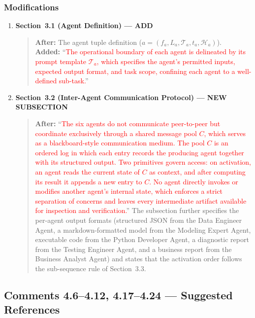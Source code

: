 \documentclass[11pt,a4paper]{article}
\begin{document}
\subsubsection{Modifications}
\begin{enumerate}
\item \textbf{Section~3.1 (Agent Definition) --- ADD}
\begin{quote}
\textbf{After:} The agent tuple definition ($a=(f_a, L_a, \mathcal{T}_a, t_a, \mathcal{H}_a)$).\\[4pt]
\textbf{Added:} ``\textcolor{red}{The operational boundary of each agent is delineated by its prompt template $\mathcal{T}_a$, which specifies the agent's permitted inputs, expected output format, and task scope, confining each agent to a well-defined sub-task.}''
\end{quote}
\item \textbf{Section~3.2 (Inter-Agent Communication Protocol) --- NEW SUBSECTION}
\begin{quote}
\textbf{After:} ``\textcolor{red}{The six agents do not communicate peer-to-peer but coordinate exclusively through a shared message pool $C$, which serves as a blackboard-style communication medium. The pool $C$ is an ordered log in which each entry records the producing agent together with its structured output. Two primitives govern access: on activation, an agent reads the current state of $C$ as context, and after computing its result it appends a new entry to $C$. No agent directly invokes or modifies another agent's internal state, which enforces a strict separation of concerns and leaves every intermediate artifact available for inspection and verification.}'' The subsection further specifies the per-agent output formats (structured JSON from the Data Engineer Agent, a markdown-formatted model from the Modeling Expert Agent, executable code from the Python Developer Agent, a diagnostic report from the Testing Engineer Agent, and a business report from the Business Analyst Agent) and states that the activation order follows the sub-sequence rule of Section~3.3.
\end{quote}
\end{enumerate}

\subsection{Comments 4.6--4.12, 4.17--4.24 --- Suggested References}
\end{document}
